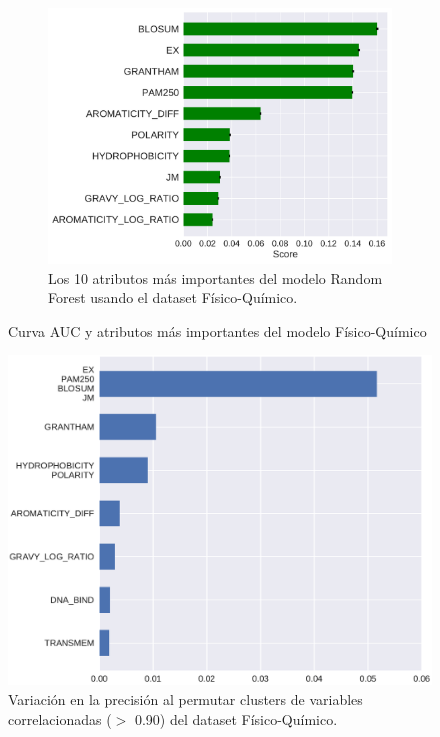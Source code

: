 \begin{figure}[H]
\begin{subfigure}[b]{0.7\textwidth}
    \centering
    \includegraphics[width=\textwidth]{documents/latex/figures/3/structural/importances_structural.pdf}
    \caption{Los 10 atributos más importantes del modelo Random Forest usando el dataset Físico-Químico.}
    \label{fig:importances_structural}
\end{subfigure}

\caption{Curva AUC y atributos más importantes del modelo Físico-Químico}
\end{figure}

\newpage

\begin{figure}[H]
    \centering
    \includegraphics[scale=0.6]{documents/latex/figures/3/structural/structural_importance_cluster.pdf}
    \caption{Variación en la precisión al permutar clusters de variables correlacionadas ($>$ 0.90) del dataset Físico-Químico.}
    \label{fig:importances_structural_cluster}
\end{figure}

